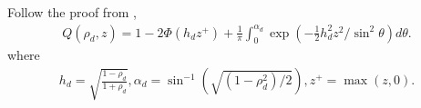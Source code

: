 \documentclass{article}
\begin{document}
Follow the proof from \cite{taylor2007maxima}, 
\begin{align*}
Q(\rho_d, z) = 1 - 2\Phi(h_dz^+) + \frac{1}{\pi}\int_{0}^{\alpha_d}\exp(-\frac{1}{2}h^2_dz^2/\sin^2\theta)d\theta. \label{eqna1}
\end{align*}
where
\begin{align*}
h_d = \sqrt{\frac{1-\rho_d}{1+\rho_d}}, \alpha_d = \sin^{-1}\left(\sqrt{(1-\rho_d^2)/2}\right), z^+ = \max(z,0).
\end{align*}

\end{document}
